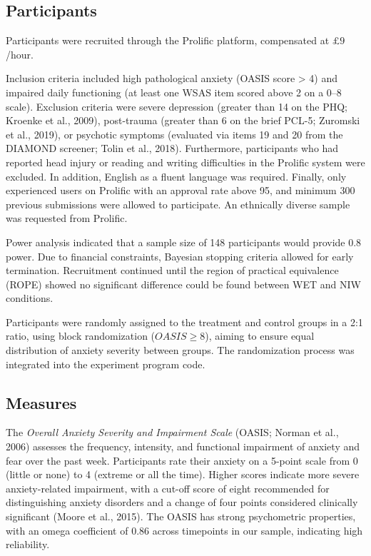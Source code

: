 \documentclass[
  man,floatsintext]{apa7}
\begin{document}
\subsection{Participants}\label{participants}

Participants were recruited through the Prolific platform, compensated at \(\pounds 9\)/hour.

Inclusion criteria included high pathological anxiety (OASIS score \textgreater{} 4)
and impaired daily functioning (at least one WSAS item scored above 2 on a 0--8 scale).
Exclusion criteria were severe depression (greater than 14 on the PHQ; Kroenke et al., 2009), post-trauma (greater than 6 on the brief PCL-5; Zuromski et al., 2019), or psychotic symptoms (evaluated via items 19 and 20 from the DIAMOND screener; Tolin et al., 2018).
Furthermore, participants who had reported head injury or reading and writing difficulties in the Prolific system were excluded.
In addition, English as a fluent language was required.
Finally, only experienced users on Prolific with an approval rate above 95, and minimum 300 previous submissions were allowed to participate.
An ethnically diverse sample was requested from Prolific.

Power analysis indicated that a sample size of 148 participants would provide 0.8 power.
Due to financial constraints, Bayesian stopping criteria allowed for early termination.
Recruitment continued until the region of practical equivalence (ROPE) showed no significant difference could be found between WET and NIW conditions.

Participants were randomly assigned to the treatment and control groups in a 2:1 ratio, using block randomization (\(OASIS \geq 8\)), aiming to ensure equal distribution of anxiety severity between groups.
The randomization process was integrated into the experiment program code.

\subsection{Measures}\label{measures}

The \emph{Overall Anxiety Severity and Impairment Scale} (OASIS; Norman et al., 2006) assesses the frequency, intensity, and functional impairment of anxiety and fear over the past week.
Participants rate their anxiety on a 5-point scale from 0 (little or none) to 4 (extreme or all the time).
Higher scores indicate more severe anxiety-related impairment, with a cut-off score of eight recommended for distinguishing anxiety disorders and a change of four points considered clinically significant (Moore et al., 2015).
The OASIS has strong psychometric properties, with an omega coefficient of 0.86 across timepoints in our sample, indicating high reliability.
\end{document}
